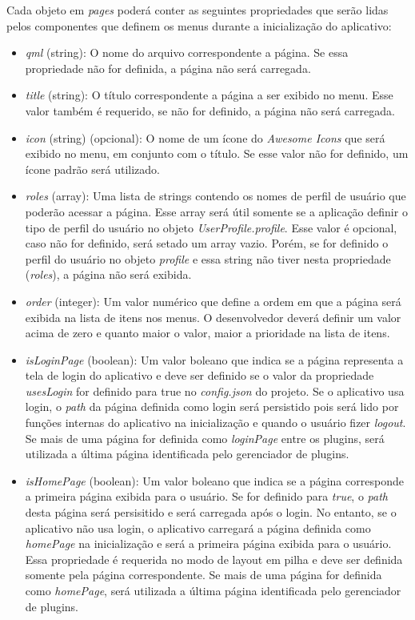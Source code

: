 Cada objeto em \textit{pages} poderá conter as seguintes propriedades que serão lidas pelos componentes que definem os menus durante a inicialização do aplicativo:

\begin{itemize}
	\item \textit{qml} (string): O nome do arquivo correspondente a página. Se essa propriedade não for definida, a página não será carregada.

	\item \textit{title} (string): O título correspondente a página a ser exibido no menu. Esse valor também é requerido, se não for definido, a página não será carregada.

	\item \textit{icon} (string) (opcional): O nome de um ícone do \textit{Awesome Icons} que será exibido no menu, em conjunto com o título. Se esse valor não for definido, um ícone padrão será utilizado.

	\item \textit{roles} (array): Uma lista de strings contendo os nomes de perfil de usuário que poderão acessar a página. Esse array será útil somente se a aplicação definir o tipo de perfil do usuário no objeto \textit{UserProfile.profile}. Esse valor é opcional, caso não for definido, será setado um array vazio. Porém, se for definido o perfil do usuário no objeto \textit{profile} e essa string não tiver nesta propriedade (\textit{roles}), a página não será exibida.

	\item \textit{order} (integer): Um valor numérico que define a ordem em que a página será exibida na lista de itens nos menus. O desenvolvedor deverá definir um valor acima de zero e quanto maior o valor, maior a prioridade na lista de itens.

	\item \textit{isLoginPage} (boolean): Um valor boleano que indica se a página representa a tela de login do aplicativo e deve ser definido se o valor da propriedade \textit{usesLogin} for definido para true no \textit{config.json} do projeto. Se o aplicativo usa login, o \textit{path} da página definida como login será persistido pois será lido por funções internas do aplicativo na inicialização e quando o usuário fizer \textit{logout}. Se mais de uma página for definida como \textit{loginPage} entre os plugins, será utilizada a última página identificada pelo gerenciador de plugins.

	\item \textit{isHomePage} (boolean): Um valor boleano que indica se a página corresponde a primeira página exibida para o usuário. Se for definido para \textit{true}, o \textit{path} desta página será persisitido e será carregada após o login. No entanto, se o aplicativo não usa login, o aplicativo carregará a página definida como \textit{homePage} na inicialização e será a primeira página exibida para o usuário. Essa propriedade é requerida no modo de layout em pilha e deve ser definida somente pela página correspondente. Se mais de uma página for definida como \textit{homePage}, será utilizada a última página identificada pelo gerenciador de plugins.


\end{itemize}
